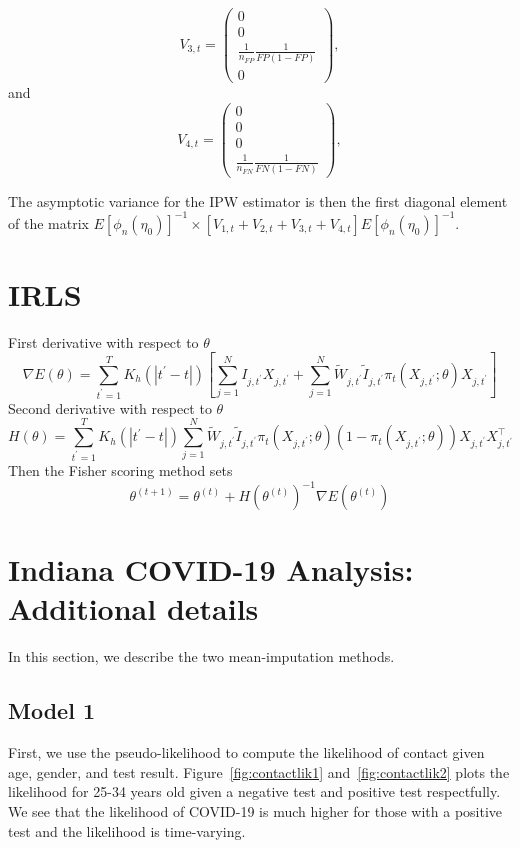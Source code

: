 \documentclass[11pt]{amsart}
\numberwithin{equation}{section}
\theoremstyle{plain}
\begin{document}
$$
V_{3,t} = \left( \begin{array}{c}
0 \\
0 \\
\frac{1}{n_{FP}} \frac{1}{FP(1-FP)} \\
0
\end{array}
\right),
$$
and
$$
V_{4,t} = \left( \begin{array}{c}
0 \\
0 \\
0 \\
\frac{1}{n_{FN}} \frac{1}{FN(1-FN)}
\end{array}
\right),
$$

The asymptotic variance for the IPW estimator is then the first diagonal element of the matrix $E \left[ \phi_n (\eta_0) \right]^{-1} \times \left[ V_{1,t} + V_{2,t} + V_{3,t} + V_{4,t} \right] E \left[ \phi_n (\eta_0) \right]^{-1}$.
\section{IRLS}
\label{app:irls}
First derivative with respect to $\theta$
$$
\nabla E(\theta) = \sum_{t^\prime=1}^T K_h(|t^\prime - t|) \left[ \sum_{j=1}^N I_{j,t^\prime} X_{j,t^\prime} + \sum_{j=1}^N \tilde W_{j,t^\prime} \tilde I_{j,t^\prime} \pi_t (X_{j,t^\prime}; \theta) X_{j,t^\prime} \right]
$$
Second derivative with respect to $\theta$
$$
H(\theta) = \sum_{t^\prime=1}^T K_h(|t^\prime - t|) \sum_{j=1}^N \tilde W_{j,t^\prime} \tilde I_{j,t^\prime} \pi_t (X_{j,t^\prime}; \theta) \left( 1- \pi_t (X_{j,t^\prime}; \theta) \right) X_{j,t^\prime} X_{j,t^\prime}^\top
$$
Then the Fisher scoring method sets
$$
\theta^{(t+1)} = \theta^{(t)} + H \left(\theta^{(t)} \right)^{-1} \nabla E \left(\theta^{(t)} \right)
$$

\section{Indiana COVID-19 Analysis: Additional details}
\label{app:in_add_details}

In this section, we describe the two mean-imputation methods.
\subsection{Model 1}

First, we use the pseudo-likelihood to compute the likelihood of contact given age, gender, and test result.  Figure~\ref{fig:contactlik1} and~\ref{fig:contactlik2} plots the likelihood for 25-34 years old given a negative test and positive test respectfully.  We see that the likelihood of COVID-19 is much higher for those with a positive test and the likelihood is time-varying.
\end{document}

